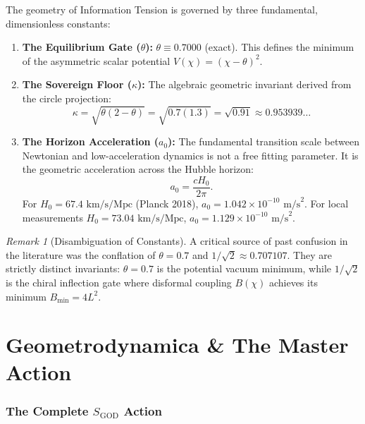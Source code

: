 \documentclass[11pt,a4paper]{article}
\theoremstyle{plain}
\theoremstyle{definition}
\theoremstyle{remark}
\newtheorem{remark}[theorem]{Remark}
\begin{document}
The geometry of Information Tension is governed by three fundamental, dimensionless constants:
\begin{enumerate}
    \item \textbf{The Equilibrium Gate ($\theta$):} $\theta \equiv 0.7000$ (exact). This defines the minimum of the asymmetric scalar potential $V(\chi) = (\chi - \theta)^2$.
    \item \textbf{The Sovereign Floor ($\kappa$):} The algebraic geometric invariant derived from the circle projection:
    \begin{equation}
    \kappa = \sqrt{\theta(2 - \theta)} = \sqrt{0.7(1.3)} = \sqrt{0.91} \approx 0.953939\dots
    \end{equation}
    \item \textbf{The Horizon Acceleration ($a_0$):} The fundamental transition scale between Newtonian and low-acceleration dynamics is not a free fitting parameter. It is the geometric acceleration across the Hubble horizon:
    \begin{equation}
    a_0 = \frac{c H_0}{2\pi}.
    \end{equation}
    For $H_0 = 67.4\text{ km/s/Mpc}$ (Planck 2018), $a_0 = 1.042 \times 10^{-10}\text{ m/s}^2$. For local measurements $H_0 = 73.04\text{ km/s/Mpc}$, $a_0 = 1.129 \times 10^{-10}\text{ m/s}^2$.
\end{enumerate}

\begin{remark}[Disambiguation of Constants]
A critical source of past confusion in the literature was the conflation of $\theta = 0.7$ and $1/\sqrt{2} \approx 0.707107$. They are strictly distinct invariants: $\theta = 0.7$ is the potential vacuum minimum, while $1/\sqrt{2}$ is the chiral inflection gate where disformal coupling $B(\chi)$ achieves its minimum $B_{\min} = 4L^2$.
\end{remark}

\newpage

\part{Geometrodynamica \& The Master Action}

\section{The Complete $S_{\text{GOD}}$ Action}
\end{document}
